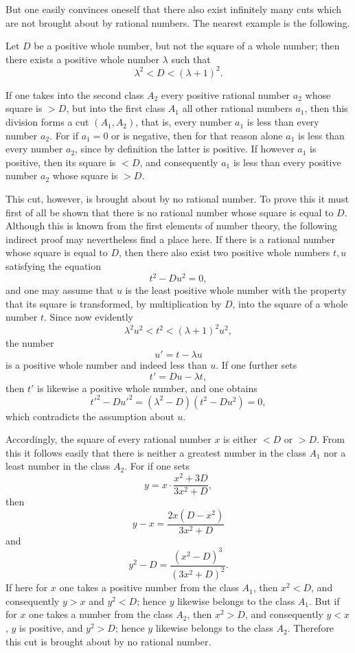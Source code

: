 \documentclass[11pt]{article}
\begin{document}
But one easily convinces oneself that there also exist infinitely many cuts which are not brought about by rational numbers. The nearest example is the following.

Let $D$ be a positive whole number, but not the square of a whole number; then there exists a positive whole number $\lambda$ such that
\[
\lambda^2<D<(\lambda+1)^2.
\]

If one takes into the second class $A_2$ every positive rational number $a_2$ whose square is $>D$, but into the first class $A_1$ all other rational numbers $a_1$, then this division forms a cut $(A_1,A_2)$, that is, every number $a_1$ is less than every number $a_2$. For if $a_1=0$ or is negative, then for that reason alone $a_1$ is less than every number $a_2$, since by definition the latter is positive. If however $a_1$ is positive, then its square is $<D$, and consequently $a_1$ is less than every positive number $a_2$ whose square is $>D$.

This cut, however, is brought about by no rational number. To prove this it must first of all be shown that there is no rational number whose square is equal to $D$. Although this is known from the first elements of number theory, the following indirect proof may nevertheless find a place here. If there is a rational number whose square is equal to $D$, then there also exist two positive whole numbers $t,u$ satisfying the equation
\[
t^2-Du^2=0,
\]
and one may assume that $u$ is the least positive whole number with the property that its square is transformed, by multiplication by $D$, into the square of a whole number $t$. Since now evidently
\[
\lambda^2u^2<t^2<(\lambda+1)^2u^2,
\]
the number
\[
u'=t-\lambda u
\]
is a positive whole number and indeed less than $u$. If one further sets
\[
t'=Du-\lambda t,
\]
then $t'$ is likewise a positive whole number, and one obtains
\[
t'^2-Du'^2=(\lambda^2-D)(t^2-Du^2)=0,
\]
which contradicts the assumption about $u$.

Accordingly, the square of every rational number $x$ is either $<D$ or $>D$. From this it follows easily that there is neither a greatest number in the class $A_1$ nor a least number in the class $A_2$. For if one sets
\[
y=x\cdot \frac{x^2+3D}{3x^2+D},
\]
then
\[
y-x=\frac{2x(D-x^2)}{3x^2+D}
\]
and
\[
y^2-D=\frac{(x^2-D)^3}{(3x^2+D)^2}.
\]
If here for $x$ one takes a positive number from the class $A_1$, then $x^2<D$, and consequently $y>x$ and $y^2<D$; hence $y$ likewise belongs to the class $A_1$. But if for $x$ one takes a number from the class $A_2$, then $x^2>D$, and consequently $y<x$, $y$ is positive, and $y^2>D$; hence $y$ likewise belongs to the class $A_2$. Therefore this cut is brought about by no rational number.
\end{document}

